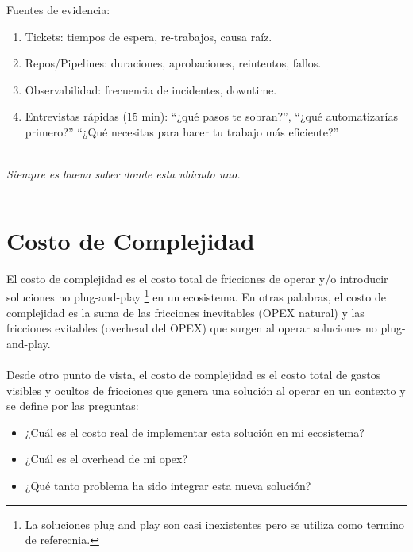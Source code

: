 Fuentes de evidencia:
\begin{enumerate}
    \item Tickets: tiempos de espera, re-trabajos, causa raíz.
    \item Repos/Pipelines: duraciones, aprobaciones, reintentos, fallos.
    \item Observabilidad: frecuencia de incidentes, downtime.
    \item Entrevistas rápidas (15 min): ``¿qué pasos te sobran?'', ``¿qué automatizarías primero?'' ``¿Qué necesitas para hacer tu trabajo más eficiente?''
\\
\\
\end{enumerate}

{\epigraph{\textit{Siempre es buena saber donde esta ubicado uno.}}{}}


\hrule
\section{Costo de Complejidad}\label{sec:cc}

El costo de complejidad es el costo total de fricciones de operar y/o introducir soluciones no plug-and-play 
\footnote{La soluciones plug and play son casi inexistentes pero se utiliza como termino de referecnia.} 
en un ecosistema. En otras palabras, el costo de complejidad es la suma de las fricciones inevitables (OPEX natural) 
y las fricciones evitables (overhead del OPEX) que surgen al operar soluciones no plug-and-play.
\\
\\
Desde otro punto de vista, el costo de complejidad es el costo total de gastos visibles y 
ocultos de fricciones que genera una solución al operar en un contexto y se define por las preguntas:

\begin{itemize}
    \item ¿Cuál es el costo real de implementar esta solución en mi ecosistema?
    \item ¿Cuál es el overhead de mi opex?
    \item ¿Qué tanto problema ha sido integrar esta nueva solución?
\end{itemize}

